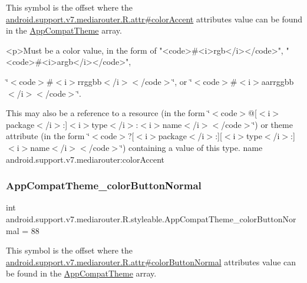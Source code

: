 This symbol is the offset where the \hyperlink{classandroid_1_1support_1_1v7_1_1mediarouter_1_1R_1_1attr_a819d6b80d88b055311583857808c3cad}{android.\+support.\+v7.\+mediarouter.\+R.\+attr\#color\+Accent} attribute\textquotesingle{}s value can be found in the \hyperlink{classandroid_1_1support_1_1v7_1_1mediarouter_1_1R_1_1styleable_a4e3d3900c75d49aeb2f283cac00214d6}{App\+Compat\+Theme} array.

\begin{DoxyVerb}      <p>Must be a color value, in the form of "<code>#<i>rgb</i></code>", "<code>#<i>argb</i></code>",
\end{DoxyVerb}
 \char`\"{}$<$code$>$\#$<$i$>$rrggbb$<$/i$>$$<$/code$>$\char`\"{}, or \char`\"{}$<$code$>$\#$<$i$>$aarrggbb$<$/i$>$$<$/code$>$\char`\"{}. 

This may also be a reference to a resource (in the form \char`\"{}$<$code$>$@\mbox{[}$<$i$>$package$<$/i$>$\+:\mbox{]}$<$i$>$type$<$/i$>$\+:$<$i$>$name$<$/i$>$$<$/code$>$\char`\"{}) or theme attribute (in the form \char`\"{}$<$code$>$?\mbox{[}$<$i$>$package$<$/i$>$\+:\mbox{]}\mbox{[}$<$i$>$type$<$/i$>$\+:\mbox{]}$<$i$>$name$<$/i$>$$<$/code$>$\char`\"{}) containing a value of this type.  name android.\+support.\+v7.\+mediarouter\+:color\+Accent \mbox{\label{classandroid_1_1support_1_1v7_1_1mediarouter_1_1R_1_1styleable_a2e67b376287180b911f79e22da40a678}} 
\subsubsection{\texorpdfstring{App\+Compat\+Theme\+\_\+color\+Button\+Normal}{AppCompatTheme\_colorButtonNormal}}
{\footnotesize\ttfamily int android.\+support.\+v7.\+mediarouter.\+R.\+styleable.\+App\+Compat\+Theme\+\_\+color\+Button\+Normal = 88\hspace{0.3cm}{\ttfamily [static]}}

This symbol is the offset where the \hyperlink{classandroid_1_1support_1_1v7_1_1mediarouter_1_1R_1_1attr_a850272e1d6fbbcfc7e8ac38e3a828cdc}{android.\+support.\+v7.\+mediarouter.\+R.\+attr\#color\+Button\+Normal} attribute\textquotesingle{}s value can be found in the \hyperlink{classandroid_1_1support_1_1v7_1_1mediarouter_1_1R_1_1styleable_a4e3d3900c75d49aeb2f283cac00214d6}{App\+Compat\+Theme} array.

